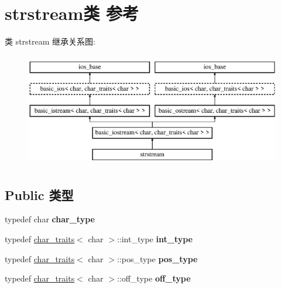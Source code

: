 \hypertarget{classstrstream}{}\section{strstream类 参考}
\label{classstrstream}
类 strstream 继承关系图\+:\begin{figure}[H]
\begin{center}
\leavevmode
\includegraphics[height=5.000000cm]{classstrstream}
\end{center}
\end{figure}
\subsection*{Public 类型}
\begin{DoxyCompactItemize}
\item 
\mbox{\label{classstrstream_a05eed0cf784786f19d557438910b04e5}} 
typedef char {\bfseries char\+\_\+type}
\item 
\mbox{\label{classstrstream_a54c54c8dbeb303ddab241a360aa947a0}} 
typedef \hyperlink{classchar__traits}{char\+\_\+traits}$<$ char $>$\+::int\+\_\+type {\bfseries int\+\_\+type}
\item 
\mbox{\label{classstrstream_a9539ce3da62d1c65ecdc32ca8b7532e2}} 
typedef \hyperlink{classchar__traits}{char\+\_\+traits}$<$ char $>$\+::pos\+\_\+type {\bfseries pos\+\_\+type}
\item 
\mbox{\label{classstrstream_afb245ff8fb46268cab4b8824d4a7433d}} 
typedef \hyperlink{classchar__traits}{char\+\_\+traits}$<$ char $>$\+::off\+\_\+type {\bfseries off\+\_\+type}
\end{DoxyCompactItemize}
